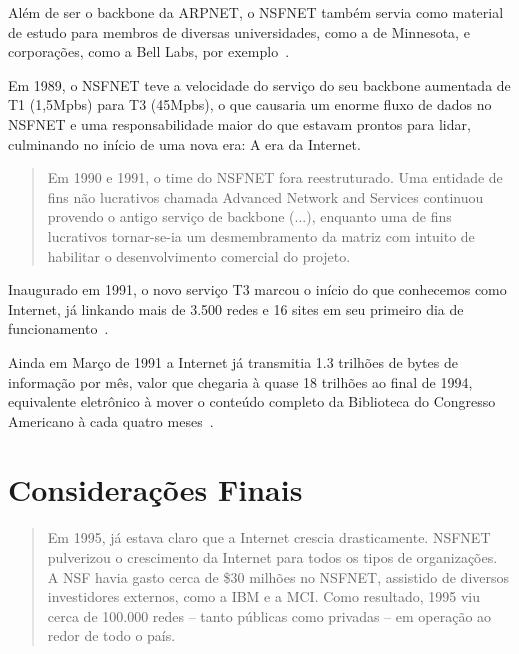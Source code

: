 \documentclass[conference]{IEEEtran}
\begin{document}
  Além de ser o backbone da ARPNET, o NSFNET também servia como material de
  estudo para membros de diversas universidades, como a de Minnesota, e
  corporações, como a Bell Labs, por exemplo~\cite{nsfnet}.

  Em 1989, o NSFNET teve a velocidade do serviço do seu backbone aumentada de T1
  (1,5Mpbs) para T3 (45Mpbs), o que causaria um enorme fluxo de dados no NSFNET
  e uma responsabilidade maior do que estavam prontos para lidar, culminando no
  início de uma nova era: A era da Internet.

  \begin{quote}

    Em 1990 e 1991, o time do NSFNET fora reestruturado. Uma entidade de
    fins não lucrativos chamada Advanced Network and Services continuou provendo
    o antigo serviço de backbone (...), enquanto uma de fins lucrativos
    tornar-se-ia um desmembramento da matriz com intuito de habilitar o
    desenvolvimento comercial do projeto.~\cite{nsfnet}

  \end{quote}

  Inaugurado em 1991, o novo serviço T3 marcou o início do que conhecemos como
  Internet, já linkando mais de 3.500 redes e 16 sites em seu primeiro dia de
  funcionamento~\cite{nsfnet}.

  Ainda em Março de 1991 a Internet já transmitia 1.3 trilhões de bytes de
  informação por mês, valor que chegaria à quase 18 trilhões ao final de 1994,
  equivalente eletrônico à mover o conteúdo completo da Biblioteca do Congresso
  Americano à cada quatro meses~\cite{nsfnet}.

\section{Considerações Finais}

  \begin{quote}

    Em 1995, já estava claro que a Internet crescia drasticamente.
    NSFNET pulverizou o crescimento da Internet para todos os tipos de
    organizações. A NSF havia gasto cerca de \$30 milhões no NSFNET, assistido
    de diversos investidores externos, como a IBM e a MCI. Como resultado, 1995
    viu cerca de 100.000 redes -- tanto públicas como privadas -- em operação ao
    redor de todo o país.~\cite{nsfnet}
    
  \end{quote}
\end{document}
